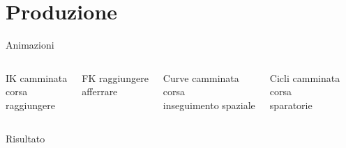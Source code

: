 \documentclass[10pt]{beamer}
\begin{document}
\section{Produzione}
\begin{frame}{Animazioni}
	\begin{columns}[T,onlytextwidth]

		\begin{exampleblock}{IK}
		camminata\\
		corsa\\
		raggiungere
		\end{exampleblock}
		\begin{exampleblock}{FK}
		raggiungere\\
		afferrare
		\end{exampleblock}

		\begin{exampleblock}{Curve}
		camminata\\
		corsa\\
		inseguimento spaziale
		\end{exampleblock}
		\begin{exampleblock}{Cicli}
		camminata\\
		corsa\\
		sparatorie
		\end{exampleblock}
	\end{columns}
\end{frame}

{
\begin{frame}[standout]

Risultato

\end{frame}
}
\end{document}
